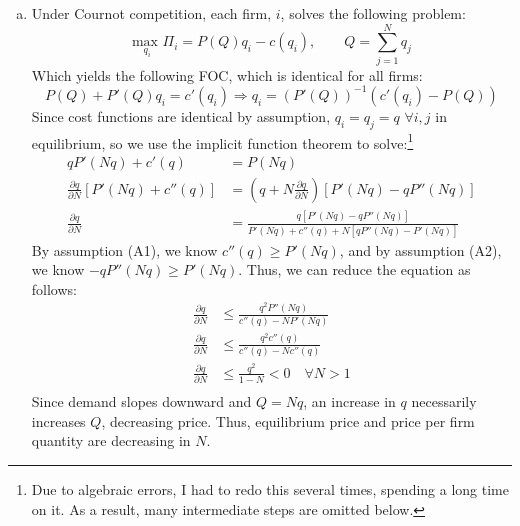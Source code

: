 \documentclass{article}
\newcommand{\usmax}[1]{\underset{#1}{\text{max }}}
\newcommand{\pl}{\partial}
\begin{document}
\begin{enumerate}
\begin{enumerate}[(a)]
			\item Under Cournot competition, each firm, $i$, solves the following problem:
                \[
                    \usmax{q_i}\Pi_i = P(Q)q_i - c(q_i),\quad\quad Q = \sum_{j=1}^N q_j
                    \]
                Which yields the following FOC, which is identical for all firms:
                \[
                    P(Q) + P'(Q)q_i = c'(q_i)\Rightarrow q_i = \left(P'(Q)\right)^{-1}\left(c'(q_i) - P(Q)\right)
                    \]
                Since cost functions are identical by assumption, $q_i=q_j=q$ $\forall i,j$ in equilibrium, so we use the implicit function theorem to solve:\footnote{Due to algebraic errors, I had to redo this several times, spending a long time on it. As a result, many intermediate steps are omitted below.}
                \begin{align*}
                    qP'(Nq) + c'(q) &= P(Nq)    \\
                    \frac{\pl q}{\pl N}\left[P'(Nq) + c''(q)\right] &= \left(q + N\frac{\pl q}{\pl N}\right)\left[P'(Nq)-qP''(Nq)\right]    \\
                    \frac{\pl q}{\pl N} &= \frac{q\left[P'(Nq)-qP''(Nq)\right]}{P'(Nq) + c''(q) + N\left[qP''(Nq) - P'(Nq)\right]}
                \end{align*}
                By assumption (A1), we know $c''(q)\geq P'(Nq)$, and by assumption (A2), we know ${-qP''(Nq)\geq P'(Nq)}$. Thus, we can reduce the equation as follows:
                \begin{align*} 
                    \frac{\pl q}{\pl N} &\leq \frac{q^2P''(Nq)}{c''(q) - NP'(Nq)}  \\
                    \frac{\pl q}{\pl N} &\leq \frac{q^2c''(q)}{c''(q) - Nc''(q)}  \\
                    \frac{\pl q}{\pl N} &\leq \frac{q^2}{1-N} < 0\quad\forall N>1  \\
                \end{align*}
                Since demand slopes downward and $Q=Nq$, an increase in $q$ necessarily increases $Q$, decreasing price. Thus, equilibrium price and price per firm quantity are decreasing in $N$.
		\end{enumerate}


\end{enumerate}
\end{document}
